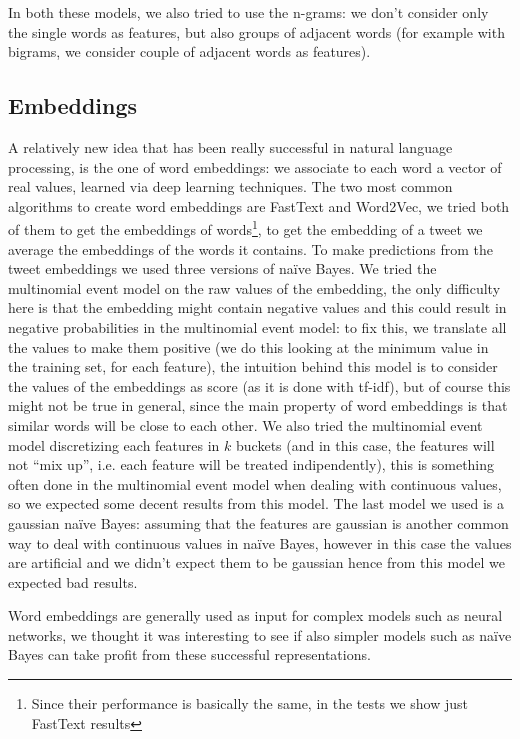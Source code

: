 \documentclass{article}
\begin{document}
    In both these models, we also tried to use the n-grams: we don't consider only the single words as features, but also groups of adjacent words (for example with bigrams, we consider couple of adjacent words as features).
    
    \subsection*{Embeddings}
    A relatively new idea that has been really successful in natural language processing, is the one of word embeddings: we associate to each word a vector of real values, learned via deep learning techniques. The two most common algorithms to create word embeddings are FastText and Word2Vec, we tried both of them to get the embeddings of words\footnote{Since their performance is basically the same, in the tests we show just FastText results}, to get the embedding of a tweet we average the embeddings of the words it contains. To make predictions from the tweet embeddings we used three versions of na\"ive Bayes. We tried the multinomial event model on the raw values of the embedding, the only difficulty here is that the embedding might contain negative values and this could result in negative probabilities in the multinomial event model: to fix this, we translate all the values to make them positive (we do this looking at the minimum value in the training set, for each feature), the intuition behind this model is to consider the values of the embeddings as score (as it is done with tf-idf), but of course this might not be true in general, since the main property of word embeddings is that similar words will be close to each other. We also tried the multinomial event model discretizing each features in $k$ buckets (and in this case, the features will not ``mix up'', i.e. each feature will be treated indipendently), this is something often done in the multinomial event model when dealing with continuous values, so we expected some decent results from this model. The last model we used is a gaussian na\"ive Bayes: assuming that the features are gaussian is another common way to deal with continuous values in na\"ive Bayes, however in this case the values are artificial and we didn't expect them to be gaussian hence from this model we expected bad results.
    
    Word embeddings are generally used as input for complex models such as neural networks, we thought it was interesting to see if also simpler models such as na\"ive Bayes can take profit from these successful representations.
    
\end{document}
